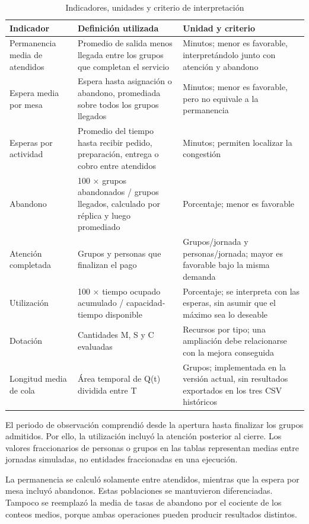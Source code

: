\documentclass[10pt,a4paper,twocolumn]{article}
\begin{document}
\begin{table}[!tb]\centering\small
\caption{Indicadores, unidades y criterio de interpretación}
\label{tab:4}
\setlength{\tabcolsep}{4pt}
\renewcommand{\arraystretch}{1.18}
\begin{tabularx}{\textwidth}{YYY}
\toprule
\textbf{Indicador} & \textbf{Definición utilizada} & \textbf{Unidad y criterio} \\
\midrule
Permanencia media de atendidos & Promedio de salida menos llegada entre los grupos que completan el servicio & Minutos; menor es favorable, interpretándolo junto con atención y abandono \\
Espera media por mesa & Espera hasta asignación o abandono, promediada sobre todos los grupos llegados & Minutos; menor es favorable, pero no equivale a la permanencia \\
Esperas por actividad & Promedio del tiempo hasta recibir pedido, preparación, entrega o cobro entre atendidos & Minutos; permiten localizar la congestión \\
Abandono & 100 \(\times\) grupos abandonados / grupos llegados, calculado por réplica y luego promediado & Porcentaje; menor es favorable \\
Atención completada & Grupos y personas que finalizan el pago & Grupos/jornada y personas/jornada; mayor es favorable bajo la misma demanda \\
Utilización & 100 \(\times\) tiempo ocupado acumulado / capacidad-tiempo disponible & Porcentaje; se interpreta con las esperas, sin asumir que el máximo sea lo deseable \\
Dotación & Cantidades M, S y C evaluadas & Recursos por tipo; una ampliación debe relacionarse con la mejora conseguida \\
Longitud media de cola & Área temporal de Q(t) dividida entre T & Grupos; implementada en la versión actual, sin resultados exportados en los tres CSV históricos \\
\bottomrule\end{tabularx}\end{table}

El periodo de observación comprendió desde la apertura hasta finalizar los grupos admitidos. Por ello, la utilización incluyó la atención posterior al cierre. Los valores fraccionarios de personas o grupos en las tablas representan medias entre jornadas simuladas, no entidades fraccionadas en una ejecución.

La permanencia se calculó solamente entre atendidos, mientras que la espera por mesa incluyó abandonos. Estas poblaciones se mantuvieron diferenciadas. Tampoco se reemplazó la media de tasas de abandono por el cociente de los conteos medios, porque ambas operaciones pueden producir resultados distintos.
\end{document}

